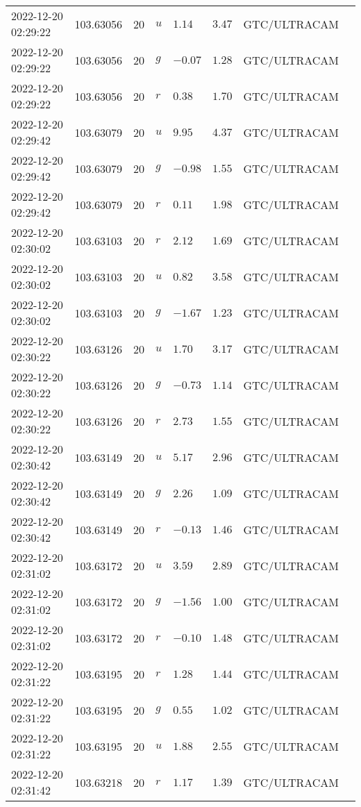 \documentclass{nature_plusfigure}
\begin{document}
\begin{supplement}
\begin{center}
\begin{longtable}{llllllll}
2022-12-20 02:29:22 & 103.63056 & 20 & $u$ & $1.14$ & $3.47$ & GTC/ULTRACAM &  \\ 
2022-12-20 02:29:22 & 103.63056 & 20 & $g$ & $-0.07$ & $1.28$ & GTC/ULTRACAM &  \\ 
2022-12-20 02:29:22 & 103.63056 & 20 & $r$ & $0.38$ & $1.70$ & GTC/ULTRACAM &  \\ 
2022-12-20 02:29:42 & 103.63079 & 20 & $u$ & $9.95$ & $4.37$ & GTC/ULTRACAM &  \\ 
2022-12-20 02:29:42 & 103.63079 & 20 & $g$ & $-0.98$ & $1.55$ & GTC/ULTRACAM &  \\ 
2022-12-20 02:29:42 & 103.63079 & 20 & $r$ & $0.11$ & $1.98$ & GTC/ULTRACAM &  \\ 
2022-12-20 02:30:02 & 103.63103 & 20 & $r$ & $2.12$ & $1.69$ & GTC/ULTRACAM &  \\ 
2022-12-20 02:30:02 & 103.63103 & 20 & $u$ & $0.82$ & $3.58$ & GTC/ULTRACAM &  \\ 
2022-12-20 02:30:02 & 103.63103 & 20 & $g$ & $-1.67$ & $1.23$ & GTC/ULTRACAM &  \\ 
2022-12-20 02:30:22 & 103.63126 & 20 & $u$ & $1.70$ & $3.17$ & GTC/ULTRACAM &  \\ 
2022-12-20 02:30:22 & 103.63126 & 20 & $g$ & $-0.73$ & $1.14$ & GTC/ULTRACAM &  \\ 
2022-12-20 02:30:22 & 103.63126 & 20 & $r$ & $2.73$ & $1.55$ & GTC/ULTRACAM &  \\ 
2022-12-20 02:30:42 & 103.63149 & 20 & $u$ & $5.17$ & $2.96$ & GTC/ULTRACAM &  \\ 
2022-12-20 02:30:42 & 103.63149 & 20 & $g$ & $2.26$ & $1.09$ & GTC/ULTRACAM &  \\ 
2022-12-20 02:30:42 & 103.63149 & 20 & $r$ & $-0.13$ & $1.46$ & GTC/ULTRACAM &  \\ 
2022-12-20 02:31:02 & 103.63172 & 20 & $u$ & $3.59$ & $2.89$ & GTC/ULTRACAM &  \\ 
2022-12-20 02:31:02 & 103.63172 & 20 & $g$ & $-1.56$ & $1.00$ & GTC/ULTRACAM &  \\ 
2022-12-20 02:31:02 & 103.63172 & 20 & $r$ & $-0.10$ & $1.48$ & GTC/ULTRACAM &  \\ 
2022-12-20 02:31:22 & 103.63195 & 20 & $r$ & $1.28$ & $1.44$ & GTC/ULTRACAM &  \\ 
2022-12-20 02:31:22 & 103.63195 & 20 & $g$ & $0.55$ & $1.02$ & GTC/ULTRACAM &  \\ 
2022-12-20 02:31:22 & 103.63195 & 20 & $u$ & $1.88$ & $2.55$ & GTC/ULTRACAM &  \\ 
2022-12-20 02:31:42 & 103.63218 & 20 & $r$ & $1.17$ & $1.39$ & GTC/ULTRACAM &  \\ 

\end{longtable}
\end{center}
\end{supplement}
\end{document}
